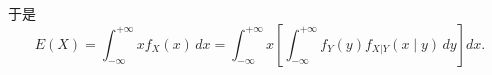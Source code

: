 于是
\[
E(X) = \int_{-\infty}^{+\infty} x f_X(x)\, dx
       = \int_{-\infty}^{+\infty} x \left[ \int_{-\infty}^{+\infty} f_Y(y) f_{X|Y}(x \mid y)\, dy \right] dx.
\]
























































\newpage

